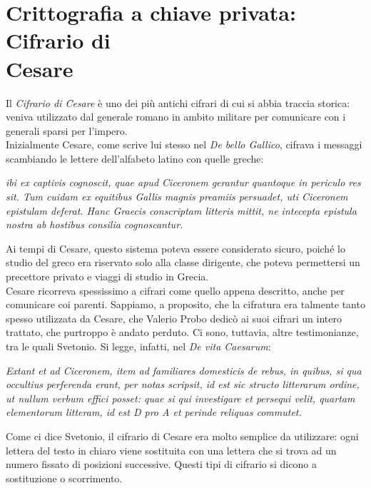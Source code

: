\documentclass[italian,A4,12pt]{article}
\begin{document}
    \section{Crittografia a chiave privata: Cifrario di \\Cesare}
    Il \textit{Cifrario di Cesare} è uno dei più antichi cifrari di cui si abbia traccia storica: veniva utilizzato dal generale romano in ambito militare per comunicare con i generali sparsi per l'impero.\\
    Inizialmente Cesare, come scrive lui stesso nel \textit{De bello Gallico}, cifrava i messaggi scambiando le lettere dell'alfabeto latino con quelle greche:
    \newpage
    \begin{displayquote}
      \textit{ibi ex captivis cognoscit, quae apud Ciceronem gerantur quantoque in periculo res sit.
      Tum cuidam ex equitibus Gallis magnis preamiis persuadet, uti Ciceronem epistulam deferat.
      Hanc Graecis conscriptam litteris mittit, ne intecepta epistula nostra ab hostibus consilia cognoscantur.}
    \end{displayquote}
    Ai tempi di Cesare, questo sistema poteva essere considerato sicuro, poiché lo studio del greco era riservato solo alla classe dirigente, che poteva permettersi un precettore privato e viaggi di studio in Grecia.\\
    Cesare ricorreva spessissimo a cifrari come quello appena descritto, anche per comunicare coi parenti. Sappiamo, a proposito, che la cifratura era talmente tanto spesso utilizzata da Cesare, che Valerio Probo dedicò ai suoi cifrari un intero trattato, che purtroppo è andato perduto. Ci sono, tuttavia, altre testimonianze, tra le quali Svetonio. Si legge, infatti, nel \textit{De vita Caesarum}:
    \begin{displayquote}
      \textit{Extant et ad Ciceronem, item ad familiares domesticis de rebus, in quibus, si qua occultius perferenda erant, per notas scripsit, id est sic structo litterarum ordine, ut nullum verbum effici posset: quae si qui investigare et persequi velit, quartam elementorum litteram, id est D pro A et perinde reliquas commutet.\\}
    \end{displayquote}
    Come ci dice Svetonio, il cifrario di Cesare era molto semplice da utilizzare: ogni lettera del testo in chiaro viene sostituita con una lettera che si trova ad un numero fissato di posizioni successive. Questi tipi di cifrario si dicono a sostituzione o scorrimento.\\
\end{document}
